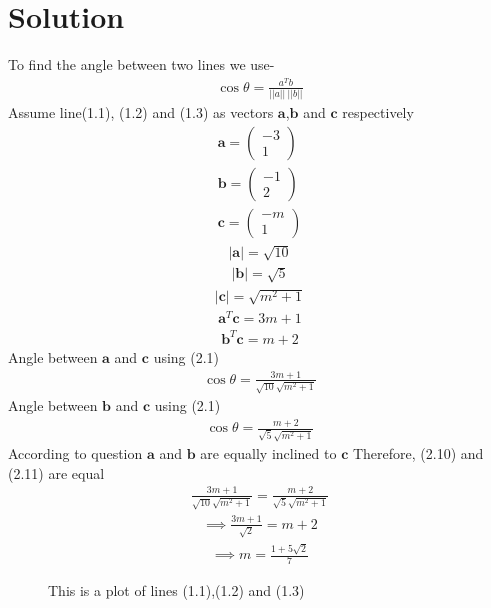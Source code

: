 \documentclass[journal,13pt,twocolumn]{IEEEtran}
\newcommand{\myvec}[1]{\ensuremath{\begin{pmatrix}#1\end{pmatrix}}}
\renewcommand{\vec}[1]{\mathbf{#1}}
\begin{document}
\section{\textbf{Solution}}
  To find the angle between two lines we use-
 \begin{align}
 \cos\theta = \frac{a^T b}{||a||~||b||}
 \end{align}
 Assume line(1.1), (1.2) and (1.3) as vectors $\vec{a}$,$\vec{b}$ and $\vec{c}$ respectively
 \begin{align}
 \vec{a} = \myvec{-3 \\ 1}\\
 \vec{b} = \myvec{-1 \\ 2}\\
 \vec{c} = \myvec{-m \\ 1}
 \end{align}
 \begin{align}
  |\vec{a}| = \sqrt{10}
 \end{align} 
 \begin{align}
  |\vec{b}| = \sqrt{5}
 \end{align} 
 \begin{align}
  |\vec{c}| = \sqrt{m^2+1}
 \end{align} 
  \begin{align}
  \vec{a}^T \vec{c} = 3m+1
  \end{align}
  \begin{align} 
  \vec{b}^T \vec{c} = m+2
 \end{align} 
 Angle between $\vec{a}$ and $\vec{c}$ using (2.1)
 \begin{align}
  \cos\theta = \frac{3m+1}{\sqrt{10}\sqrt{m^2+1}}
 \end{align}
  Angle between $\vec{b}$ and  $\vec{c}$ using (2.1)
 \begin{align}
 \cos\theta = \frac{m+2}{\sqrt{5}\sqrt{m^2+1}}
 \end{align}
  According to question
  $\vec{a}$ and $\vec{b}$ are equally inclined to $\vec{c}$
  Therefore, (2.10) and (2.11) are equal
  \begin{align}
  \frac{3m+1}{\sqrt{10}\sqrt{m^2+1}} = \frac{m+2}{\sqrt{5}\sqrt{m^2+1}}
  \end{align}
  \begin{align}
  \implies \frac{3m+1}{\sqrt{2}} = m+2
  \end{align}
   \begin{align}
   \implies m = \frac{1+5\sqrt{2}}{7}
   \end{align}    
   \begin{figure}
   \centering
   \caption{This is a plot of lines (1.1),(1.2) and (1.3)}
   \end{figure}
\end{document}
